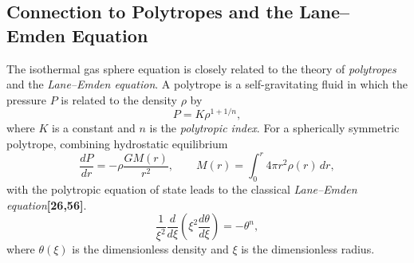 \documentclass[12pt,a4paper]{article}
\numberwithin{equation}{section}
\begin{document}
\subsection{Connection to Polytropes and the Lane--Emden Equation}
The isothermal gas sphere equation is closely related to the theory of \emph{polytropes} and the \emph{Lane--Emden equation}. A polytrope is a self-gravitating fluid in which the pressure $P$ is related to the density $\rho$ by
\begin{equation}
P = K \rho^{1 + 1/n},
\end{equation}
where $K$ is a constant and $n$ is the \emph{polytropic index}. For a spherically symmetric polytrope, combining hydrostatic equilibrium
\begin{equation}
\frac{dP}{dr} = - \rho \frac{G M(r)}{r^2}, \qquad M(r) = \int_0^r 4 \pi r^2 \rho(r) \, dr,
\end{equation}
with the polytropic equation of state leads to the classical \emph{Lane--Emden equation}\textbf{[26,56]}.
\begin{equation}
\frac{1}{\xi^2} \frac{d}{d\xi} \left( \xi^2 \frac{d \theta}{d\xi} \right) = - \theta^n,
\end{equation}
where $\theta(\xi)$ is the dimensionless density and $\xi$ is the dimensionless radius.
\end{document}
